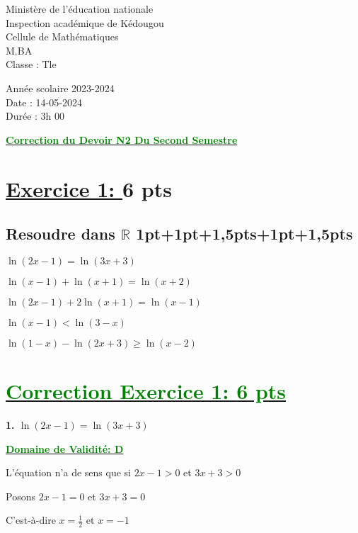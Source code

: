 \documentclass[12pt]{article}
\begin{document}
\begin{minipage}{0.5\textwidth}
	Ministère de l'éducation nationale  \\
	Inspection académique de Kédougou   \\
	Cellule de Mathématiques\\
	M.BA\\
	Classe : Tle  \\
\end{minipage}
\begin{minipage}{0.5\textwidth}
	Année scolaire 2023-2024 \\
	Date : 14-05-2024 \\
	Durée : 3h 00 \\
\end{minipage}

\begin{center}
	\textbf{{\underline{\textcolor{green}{Correction du Devoir N2 Du Second Semestre}}}}
\end{center}
\section*{\underline{Exercice 1: }\textbf{6 pts}}
\subsection*{ Resoudre dans $\mathbb{R}$ 1pt+1pt+1,5pts+1pt+1,5pts}
$\ln(2x-1)=\ln(3x+3)$

$\ln(x-1)+\ln(x+1)=\ln(x+2)$

$\ln(2x-1)+2\ln(x+1)=\ln(x-1)$

$\ln(x-1)<\ln(3-x)$

$\ln(1-x)-\ln(2x+3)\geq\ln(x-2)$
\section*{\underline{\textcolor{green}{Correction Exercice 1: \textbf{6 pts}}}}
\textbf{1. \(\ln(2x-1)=\ln(3x+3)\)}

\textbf{\underline{\textcolor{green}{Domaine de Validité: D}}}

L'équation n'a de sens que si $2x-1>0$ et $3x+3>0$

Posons $2x-1=0$ et $3x+3=0$

C'est-à-dire $x=\frac{1}{2}$ et $x=-1$
\end{document}
